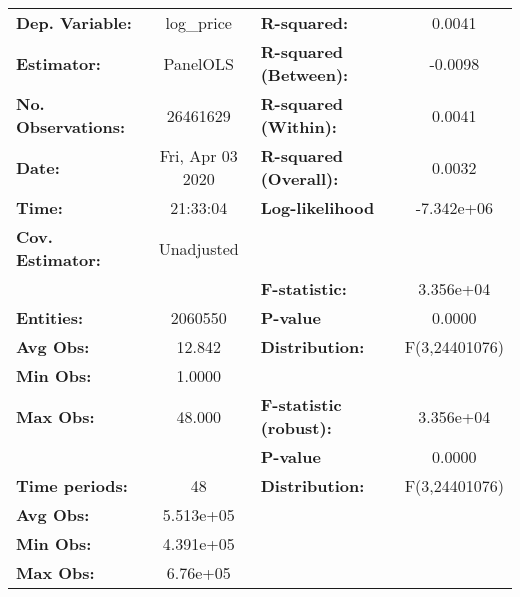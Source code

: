 \documentclass{report}
\begin{document}
\begin{center}
\begin{tabular}{lclc}
\toprule
\textbf{Dep. Variable:}      &     log\_price     & \textbf{  R-squared:         }   &      0.0041      \\
\textbf{Estimator:}          &      PanelOLS      & \textbf{  R-squared (Between):}  &     -0.0098      \\
\textbf{No. Observations:}   &      26461629      & \textbf{  R-squared (Within):}   &      0.0041      \\
\textbf{Date:}               &  Fri, Apr 03 2020  & \textbf{  R-squared (Overall):}  &      0.0032      \\
\textbf{Time:}               &      21:33:04      & \textbf{  Log-likelihood     }   &    -7.342e+06    \\
\textbf{Cov. Estimator:}     &     Unadjusted     & \textbf{                     }   &                  \\
\textbf{}                    &                    & \textbf{  F-statistic:       }   &    3.356e+04     \\
\textbf{Entities:}           &      2060550       & \textbf{  P-value            }   &      0.0000      \\
\textbf{Avg Obs:}            &       12.842       & \textbf{  Distribution:      }   &  F(3,24401076)   \\
\textbf{Min Obs:}            &       1.0000       & \textbf{                     }   &                  \\
\textbf{Max Obs:}            &       48.000       & \textbf{  F-statistic (robust):} &    3.356e+04     \\
\textbf{}                    &                    & \textbf{  P-value            }   &      0.0000      \\
\textbf{Time periods:}       &         48         & \textbf{  Distribution:      }   &  F(3,24401076)   \\
\textbf{Avg Obs:}            &     5.513e+05      & \textbf{                     }   &                  \\
\textbf{Min Obs:}            &     4.391e+05      & \textbf{                     }   &                  \\
\textbf{Max Obs:}            &      6.76e+05      & \textbf{                     }   &                  \\
\bottomrule
\end{tabular}
\begin{tabular}{lcccccc}

\end{tabular}
\end{center}
\end{document}
